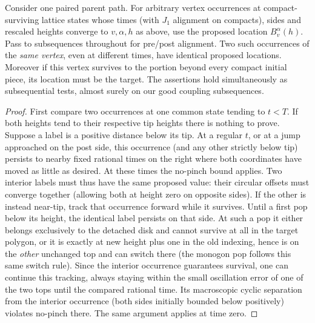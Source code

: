 \begin{lemma}\label{cut:incidence-consistency}

Consider one paired parent path.
For arbitrary vertex occurrences at compact-surviving lattice states whose times (with \(J_1\) alignment on compacts), sides and rescaled heights converge to \(v,\alpha,h\) as above, use the proposed location \(B^\alpha_v(h)\).
Pass to subsequences throughout for pre/post alignment.
Two such occurrences of the \emph{same vertex}, even at different times, have identical proposed locations.
Moreover if this vertex survives to the portion beyond every compact initial piece, its location must be the target.
The assertions hold simultaneously as subsequential tests, almost surely on our good coupling subsequences.

\end{lemma}\begin{proof}\leavevmode


First compare two occurrences at one common state tending to \(t<T\).
If both heights tend to their respective tip heights there is nothing to prove.
Suppose a label is a positive distance below its tip.
At a regular \(t\), or at a jump approached on the post side, this occurrence (and any other strictly below tip) persists to nearby fixed rational times on the right where both coordinates have moved as little as desired.
At these times the no-pinch bound applies.
Two interior labels must thus have the same proposed value: their circular offsets must converge together (allowing both at height zero on opposite sides).
If the other is instead near-tip, track that occurrence forward while it survives.
Until a first pop below its height, the identical label persists on that side.
At such a pop it either belongs exclusively to the detached disk and cannot survive at all in the target polygon, or it is exactly at new height plus one in the old indexing, hence is on the \emph{other} unchanged top and can switch there (the monogon pop follows this same switch rule).
Since the interior occurrence guarantees survival, one can continue this tracking, always staying within the small oscillation error of one of the two tops until the compared rational time.
Its macroscopic cyclic separation from the interior occurrence (both sides initially bounded below positively) violates no-pinch there.
The same argument applies at time zero.


\end{proof}
